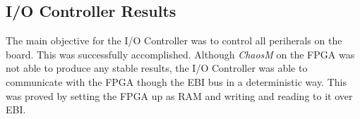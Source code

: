 \subsection{I/O Controller Results}

The main objective for the I/O Controller was to control all periherals on the board.
This was successfully accomplished. Although \textit{ChaosM} on the FPGA was not able
to produce any stable results, the I/O Controller was able to communicate with the
FPGA though the EBI bus in a deterministic way. This was proved by setting the
FPGA up as RAM and writing and reading to it over EBI.

